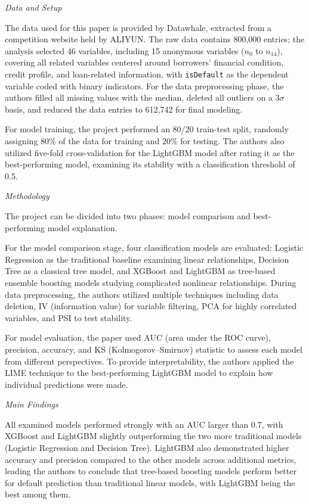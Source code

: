 \documentclass[letterpaper]{article}
\begin{document}
		\medskip
		
		\textit{Data and Setup}
		
		The data used for this paper is provided by Datawhale, extracted from a competition website held by ALIYUN. The raw data contains 800,000 entries; the analysis selected 46 variables, including 15 anonymous variables ($n_0$ to $n_{14}$), covering all related variables centered around borrowers' financial condition, credit profile, and loan-related information, with \texttt{isDefault} as the dependent variable coded with binary indicators. For the data preprocessing phase, the authors filled all missing values with the median, deleted all outliers on a $3\sigma$ basis, and reduced the data entries to 612,742 for final modeling.
		
		For model training, the project performed an 80/20 train-test split, randomly assigning 80\% of the data for training and 20\% for testing. The authors also utilized five-fold cross-validation for the LightGBM model after rating it as the best-performing model, examining its stability with a classification threshold of 0.5.
		
		\medskip
		
		\textit{Methodology}
		
		The project can be divided into two phases: model comparison and best-performing model explanation.
		
		For the model comparison stage, four classification models are evaluated: Logistic Regression as the traditional baseline examining linear relationships, Decision Tree as a classical tree model, and XGBoost and LightGBM as tree-based ensemble boosting models studying complicated nonlinear relationships. During data preprocessing, the authors utilized multiple techniques including data deletion, IV (information value) for variable filtering, PCA for highly correlated variables, and PSI to test stability.
		
		For model evaluation, the paper used AUC (area under the ROC curve), precision, accuracy, and KS (Kolmogorov--Smirnov) statistic to assess each model from different perspectives. To provide interpretability, the authors applied the LIME technique to the best-performing LightGBM model to explain how individual predictions were made.
		
		\medskip
		
		\textit{Main Findings}
		
		All examined models performed strongly with an AUC larger than 0.7, with XGBoost and LightGBM slightly outperforming the two more traditional models (Logistic Regression and Decision Tree). LightGBM also demonstrated higher accuracy and precision compared to the other models across additional metrics, leading the authors to conclude that tree-based boosting models perform better for default prediction than traditional linear models, with LightGBM being the best among them.
		
\end{document}
